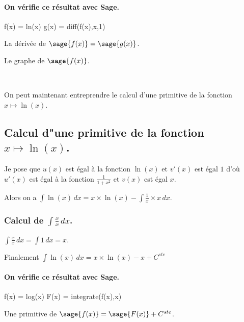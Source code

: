 \documentclass[a4paper,landscape,17pt]{extreport} %
\begin{document}
\paragraph{On vérifie ce résultat avec Sage.}


\begin{sageblock}
    f(x) = ln(x)
    g(x) = diff(f(x),x,1)
\end{sageblock}

La dérivée de $\sage{f(x)} = \sage{g(x)} $.

Le graphe de $\sage{f(x)} $.


\begin{center}
 \\
\end{center}


On peut maintenant entreprendre le calcul d'une primitive de la  fonction  $x \mapsto \ln(x) $.


\subsection{Calcul d"une primitive de la fonction  $x \mapsto \ln(x) $.}


Je pose que $u(x)$  est égal à la fonction $\ln(x)$ et $v'(x)$ est égal $1$  d'où $u'(x)$  est égal à la fonction $ \frac{1}{1+ x^2} $ et $v(x)$ est égal $x$.

Alors on a $\int \ln(x) \, dx = x \times \ln(x) -\int \frac{1}{x} \times x \, dx $.


\subsubsection{Calcul de $\int \frac{x}{x} \, dx $.}

$\int \frac{x}{x} \, dx = \int 1 \, dx = x$.


Finalement $\int \ln(x) \, dx = x \times \ln(x) -x + C^{ste} $

\paragraph{On vérifie ce résultat avec Sage.}


\begin{sageblock}
    f(x) = log(x)
    F(x) = integrate(f(x),x)
\end{sageblock}

Une primitive de $\sage{f(x)} = \sage{F(x)} + C^{ste} $.
\end{document}
